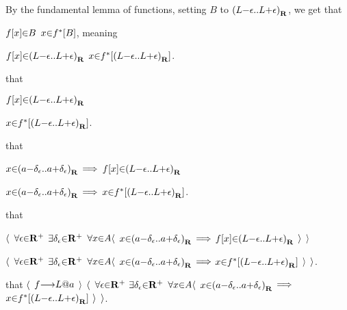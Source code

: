 \hs\hs\hs\hs \par
\hs\hs\hs\hs By the fundamental lemma of functions, setting $B$ to $\a(L\p-\epsilon \a{..} L\p+\epsilon\a)_\R$, we get that \par
\hs\hs\hs\hs $f[x] \p\in B$  $x \p\in f^*[B]$, meaning \par
\hs\hs\hs\hs $f[x] \p\in \a(L\p-\epsilon \a{..} L\p+\epsilon\a)_\R$  $x \p\in f^*[\a(L\p-\epsilon \a{..} L\p+\epsilon\a)_\R]$. \par

\hs\hs\hs \par
\hs\hs\hs {} that \par
\hs\hs\hs $f[x] \p\in \a(L\p-\epsilon \a{..} L\p+\epsilon\a)_\R$ \par
\hs\hs\hs {} \par
\hs\hs\hs $x \p\in f^*[\a(L\p-\epsilon \a{..} L\p+\epsilon\a)_\R]$. \par

\hs\hs \par
\hs\hs {} that \par
\hs\hs $x \p\in \a(a\p-\delta_\epsilon \a{..} a\p+\delta_\epsilon\a)_\R$ $\a\lthen$ $f[x] \p\in \a(L\p-\epsilon \a{..} L\p+\epsilon\a)_\R$ \par
\hs\hs {} \par
\hs\hs $x \p\in \a(a\p-\delta_\epsilon \a{..} a\p+\delta_\epsilon\a)_\R$ $\a\lthen$ $x \p\in f^*[\a(L\p-\epsilon \a{..} L\p+\epsilon\a)_\R]$. \par

\hs \par
\hs {} that \par
\hs $\a\langle$ $\a\forall \epsilon \p\in \R^+$ $\a\exists \delta_\epsilon \p\in \R^+$ $\a\forall x \p\in A \a\langle$ $x \p\in \a(a\p-\delta_\epsilon \a{..} a\p+\delta_\epsilon\a)_\R$ $\a\lthen$ $f[x] \p\in \a(L\p-\epsilon \a{..} L\p+\epsilon\a)_\R$ $\a\rangle$ $\a\rangle$ \par
\hs {} \par
\hs $\a\langle$ $\a\forall \epsilon \p\in \R^+$ $\a\exists \delta_\epsilon \p\in \R^+$ $\a\forall x \p\in A \a\langle$ $x \p\in \a(a\p-\delta_\epsilon \a{..} a\p+\delta_\epsilon\a)_\R$ $\a\lthen$ $x \p\in f^*[\a(L\p-\epsilon \a{..} L\p+\epsilon\a)_\R]$ $\a\rangle$ $\a\rangle$. \par

\vs
{} that $\a\langle$ $f \to L \p@ a$ $\a\rangle$  $\a\langle$ $\a\forall \epsilon \p\in \R^+$ $\a\exists \delta_\epsilon \p\in \R^+$ $\a\forall x \p\in A \a\langle$ $x \p\in \a(a\p-\delta_\epsilon \a{..} a\p+\delta_\epsilon\a)_\R$ $\a\lthen$ $x \p\in f^*[\a(L\p-\epsilon \a{..} L\p+\epsilon\a)_\R]$ $\a\rangle$ $\a\rangle$. \par

